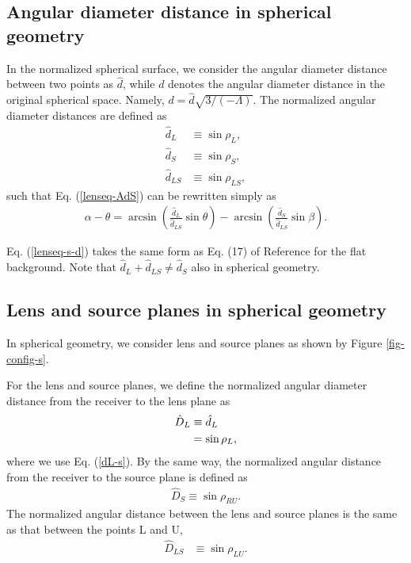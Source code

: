 \documentclass[twocolumn,showpacs,preprintnumbers,amsmath,amssymb]{revtex4-1}
\begin{document}
\subsection{Angular diameter distance in spherical geometry}
In the normalized spherical surface, 
we consider the angular diameter distance 
between two points as $\hat d$, 
while $d$ denotes 
the angular diameter distance in the original spherical space. 
Namely, 
$d = \hat d \sqrt{3/(-\Lambda)}$. 
The normalized angular diameter distances are defined as 
\begin{align}
\hat d_L 
&\equiv \sin\rho_L , 
\label{dL-s}
\\
\hat d_S 
&\equiv \sin\rho_S , 
\label{dS-s}
\\
\hat d_{LS} 
&\equiv \sin\rho_{LS} , 
\label{dLS-s}
\end{align}
such that Eq. (\ref{lenseq-AdS}) can be rewritten simply as 
\begin{align}
\alpha - \theta 
= 
\arcsin\left(\frac{\hat d_L}{\hat d_{LS}}\sin\theta\right)
- \arcsin\left(\frac{\hat d_S}{\hat d_{LS}}\sin\beta\right) . 
\label{lenseq-s-d}
\end{align}

Eq. (\ref{lenseq-s-d}) takes the same form as 
Eq. (17) of Reference \cite{Takizawa2020b} 
for the flat background. 
Note that $\hat d_L + \hat d_{LS} \neq \hat d_S$ also in spherical geometry. 



\subsection{Lens and source planes in spherical geometry}
In spherical geometry, 
we consider lens and source planes 
as shown by Figure \ref{fig-config-s}. 

For the lens and source planes, 
we define 
the normalized angular diameter distance from the receiver to the lens plane 
as 
\begin{align}
\hat D_L 
&\equiv 
\hat d_L 
\notag\\
&= \sin\rho_L , 
\label{DL-s}
\end{align}
where we use Eq. (\ref{dL-s}). 
By the same way, 
the normalized angular distance from the receiver to the source plane 
is defined as 
\begin{align}
\hat D_S 
\equiv 
\sin\rho_{RU} . 
\label{DS-s}
\end{align} 
The normalized angular distance between the lens and source planes  
is the same as that between the points L and U, 
\begin{align}
\hat D_{LS} 
&\equiv 
\sin\rho_{LU} .
\label{DLS-s}
\end{align}
\end{document}
